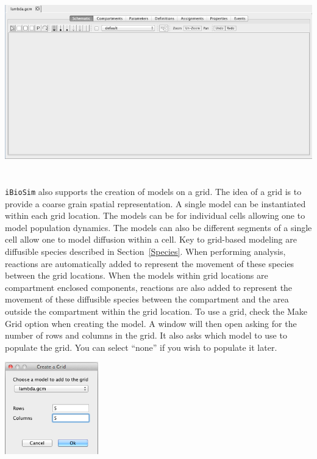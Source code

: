 \documentclass[titlepage,11pt]{article}
\begin{document}
\begin{center}
\includegraphics[height=80mm]{screenshots/ModelEditor}
\end{center}

\noindent
{\tt iBioSim} also supports the creation of models on a grid.  The idea of a grid is to provide a coarse grain spatial representation.  A single model can be instantiated within each grid location.  The models can be for individual cells allowing one to model population dynamics.  The models can also be different segments of a single cell allow one to model diffusion within a cell.  Key to grid-based modeling are diffusible species described in Section~\ref{Species}.  When performing analysis, reactions are automatically added to represent the movement of these species between the grid locations.  When the models within grid locations are compartment enclosed components, reactions are also added to represent the movement of these diffusible species between the compartment and the area outside the compartment within the grid location.
To use a grid, check the Make Grid option when creating the model.  A window will then open asking for the number of rows and columns in the grid.  It also asks which model to use to populate the grid.  You can select ``none'' if you wish to populate it later.

\begin{center}
\includegraphics[height=40mm]{screenshots/createGrid}
\end{center}
\end{document}
